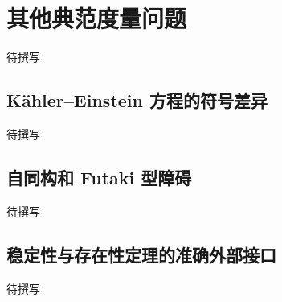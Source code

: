
% 
% 
% 

\section{其他典范度量问题}
\label{g4:sec:3105}

待撰写

\subsection{Kähler–Einstein 方程的符号差异}
\label{g4:subsec:3105:01}
待撰写

\subsection{自同构和 Futaki 型障碍}
\label{g4:subsec:3105:02}
待撰写

\subsection{稳定性与存在性定理的准确外部接口}
\label{g4:subsec:3105:03}
待撰写
